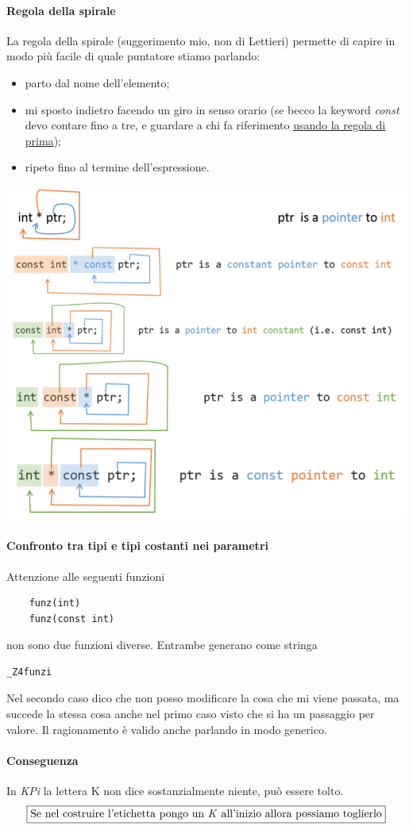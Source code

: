 \paragraph{Regola della spirale} La regola della spirale (suggerimento mio, non di Lettieri) permette di capire in modo più facile di quale puntatore stiamo parlando:
\begin{itemize}
	\item parto dal nome dell'elemento;
	\item mi sposto indietro facendo un giro in senso orario (se becco la keyword \emph{const} devo contare fino a tre, e guardare a chi fa riferimento \underline{usando la regola di prima});
	\item ripeto fino al termine dell'espressione.
\end{itemize}
\begin{center}
	\includegraphics[scale=0.80]{img/154.PNG}
\end{center}  

\paragraph{Confronto tra tipi e tipi costanti nei parametri} Attenzione alle seguenti funzioni
\begin{verbatim}
	funz(int)
	funz(const int)
\end{verbatim}
non sono due funzioni diverse. Entrambe generano come stringa \begin{verbatim}_Z4funzi\end{verbatim}Nel secondo caso dico che non posso modificare la cosa che mi viene passata, ma succede la stessa cosa anche nel primo caso visto che si ha un passaggio per valore. Il ragionamento è valido anche parlando in modo generico.\paragraph{Conseguenza} In \emph{KPi} la lettera K non dice sostanzialmente niente, può essere tolto.
\[\boxed{\text{Se nel costruire l'etichetta pongo un \emph{K} all'inizio allora possiamo toglierlo}}\]
